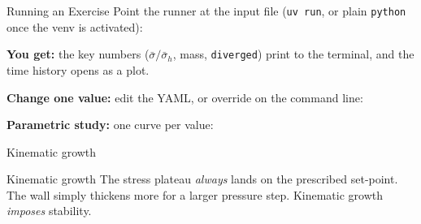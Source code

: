 \begin{frame}[t]{Running an Exercise}
  \small
  Point the runner at the input file (\texttt{uv run}, or plain \texttt{python}
  once the venv is activated):
  \par\smallskip
  \vspace{0.3em}\par
  \textbf{You get:} the key numbers ($\bar\sigma/\bar\sigma_h$, mass,
  \texttt{diverged}) print to the terminal, and the time history opens as a plot.
  \vspace{0.5em}\par
  \textbf{Change one value:} edit the YAML, or override on the command line:
  \par\smallskip
  \vspace{0.3em}\par
  \textbf{Parametric study:} one curve per value:
  \par\smallskip
\end{frame}

\begin{frame}[t]{}
  \begin{yourturnbox}{Kinematic growth}
  \end{yourturnbox}
\end{frame}

\begin{frame}[t]{}
  \begin{answerbox}{Kinematic growth}
    The stress plateau \emph{always} lands on the prescribed set-point. The wall simply thickens more for a larger pressure step. Kinematic growth \emph{imposes} stability.
  \end{answerbox}
  \vspace{-0.2em}
\end{frame}
